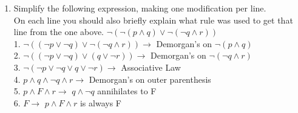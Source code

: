 \documentclass[12pt]{article}
\begin{document}
\begin{enumerate}
{\vskip1cm
The pigeonhole principle is shows why r cannot be made larger than 4.\\
If r were 5, with 15 gaps between the teams, there would need to be a total spread of 90: $15\cdot 6 = 90$. \\
But with only 5 rounds remaining, the maximum spread is 85.\\
Thus, if we take the possible win totals of the teams as the holes and the teams as the pigeons, then, with 5 rounds remaining,
there are only 86 possible win totals (0 through 85).\\
For no team to care about improving their rank, team wins must differ by at least 6, which means that there can only be 15 possible win totals (0,6,12,...,90).\\
Thus, there are not enough holes to place all 16 teams while maintaing the required spacing of wins.\\
}







\newpage

\item
Simplify the following expression, making one modification per line.\\
On each line you should also  briefly explain what rule was used to get that line from the one above. 
$\neg ( \neg (p\land q) \lor \neg (\neg q \land r) )$ \\


{\color{blue}
1. $\neg ( (\neg p \lor \neg q) \lor \neg (\neg q \land r) ) \rightarrow$ Demorgan's on $\neg (p\land q) $\\
2. $\neg ( (\neg p \lor \neg q) \lor  (q \lor \neg r) ) \rightarrow$ Demorgan's on $ \neg (\neg q \land r) $\\
3. $\neg ( \neg p \lor \neg q \lor  q \lor \neg r ) \rightarrow$ Associative Law \\
4. $p \land q \land  \neg q \land r \rightarrow $ Demorgan's on outer parenthesis \\
5. $p \land F \land r \rightarrow$ $q \land  \neg q$ annihilates to F \\
6. $F \rightarrow$ $p \land F \land r$ is always F \\
}

\newpage



\end{enumerate}
\end{document}
